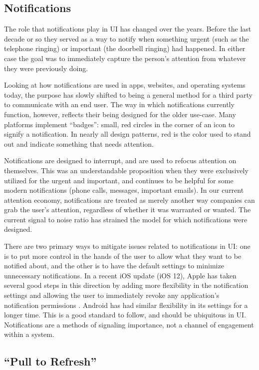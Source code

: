 \documentclass[12pt, oneside]{article}
\begin{document}
\subsection{Notifications}

The role that notifications play in UI has changed over the years. Before the last decade or so they served as a way to notify when something urgent (such as the telephone ringing) or important (the doorbell ringing) had happened. In either case the goal was to immediately capture the person's attention from whatever they were previously doing.

Looking at how notifications are used in apps, websites, and operating systems today, the purpose has slowly shifted to being a general method for a third party to communicate with an end user. The way in which notifications currently function, however, reflects their being designed for the older use-case. Many platforms implement ``badges'': small, red circles in the corner of an icon to signify a notification. In nearly all design patterns, red is the color used to stand out and indicate something that needs attention.

Notifications are designed to interrupt, and are used to refocus attention on themselves. This was an understandable proposition when they were exclusively utilized for the urgent and important, and continues to be helpful for some modern notifications (phone calls, messages, important emails). In our current attention economy, notifications are treated as merely another way companies can grab the user's attention, regardless of whether it was warranted or wanted. The current signal to noise ratio has strained the model for which notifications were designed.

There are two primary ways to mitigate issues related to notifications in UI: one is to put more control in the hands of the user to allow what they want to be notified about, and the other is to have the default settings to minimize unnecessary notifications. In a recent iOS update (iOS 12), Apple has taken several good steps in this direction by adding more flexibility in the notification settings and allowing the user to immediately revoke any application's notification permissions \cite{winkelman_2018}. Android has had similar flexibility in its settings for a longer time. This is a good standard to follow, and should be ubiquitous in UI. Notifications are a methods of signaling importance, not a channel of engagement within a system.

\subsection{``Pull to Refresh''}
\end{document}
